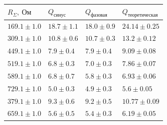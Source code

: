 \documentclass[a4paper,12pt]{extarticle}
\begin{document}
\begin{table}[h!]
\begin{tabular}{|l|l|l|l|}
\hline
\rowcolor[HTML]{343434}
{\color[HTML]{FFFFFF} $R_\Sigma, \ \text{Ом}$} & {\color[HTML]{FFFFFF} $Q_\text{синус}$} & {\color[HTML]{FFFFFF} $Q_\text{фазовая}$} & {\color[HTML]{FFFFFF} $Q_\text{теоретическая}$} \\ \hline
$ 169.1 \pm 1.0 $                              & $ 18.7 \pm 1.1 $                        & $ 18.0 \pm 0.9 $                          & $ 24.14 \pm 0.25 $                              \\ \hline
$ 309.1 \pm 1.0 $                              & $ 10.8 \pm 0.6 $                        & $ 10.7 \pm 0.3 $                          & $ 13.2 \pm 0.12 $                               \\ \hline
$ 449.1 \pm 1.0 $                              & $ 7.9 \pm 0.4 $                         & $ 7.9 \pm 0.4 $                           & $ 9.09 \pm 0.08 $                               \\ \hline
$ 519.1 \pm 1.0 $                              & $ 6.8 \pm 0.3 $                         & $ 7.0 \pm 0.3 $                           & $ 7.86 \pm 0.07 $                               \\ \hline
$ 589.1 \pm 1.0 $                              & $ 6.8 \pm 0.7 $                         & $ 5.8 \pm 0.3 $                           & $ 6.93 \pm 0.06 $                               \\ \hline
$ 729.1 \pm 1.0 $                              & $ 5.0 \pm 0.3 $                         & $ 4.9 \pm 0.3 $                           & $ 5.6 \pm 0.05 $                                \\ \hline
$ 379.1 \pm 1.0 $                              & $ 9.3 \pm 0.6 $                         & $ 9.2 \pm 0.5 $                           & $ 10.77 \pm 0.09 $                              \\ \hline
$ 659.1 \pm 1.0 $                              & $ 5.6 \pm 0.5 $                         & $ 5.4 \pm 0.3 $                           & $ 6.19 \pm 0.05 $                               \\ \hline
\end{tabular}
\end{table}
\end{document}
